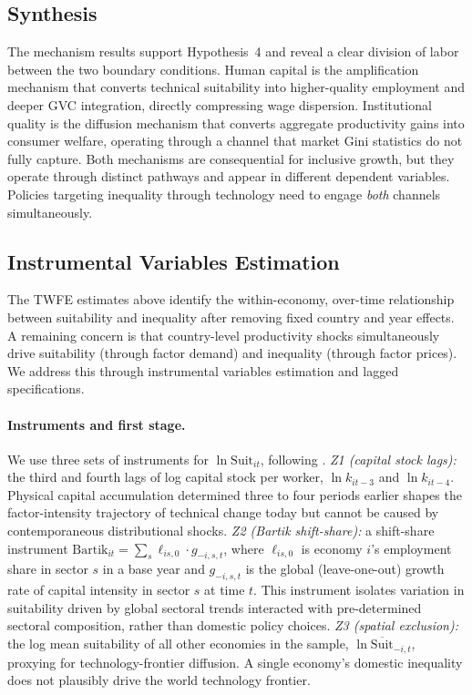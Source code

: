 \documentclass[12pt]{article}
\newcommand{\suit}{\mathrm{Suit}}
\begin{document}
\subsection{Synthesis}

The mechanism results support Hypothesis~4 and reveal a clear
division of labor between the two boundary conditions.
Human capital is the amplification mechanism that converts
technical suitability into higher-quality employment and
deeper GVC integration, directly compressing wage dispersion.
Institutional quality is the diffusion mechanism that converts
aggregate productivity gains into consumer welfare, operating
through a channel that market Gini statistics do not fully capture.
Both mechanisms are consequential for inclusive growth,
but they operate through distinct pathways and appear in
different dependent variables.
Policies targeting inequality through technology need to
engage \emph{both} channels simultaneously.

\subsection{Instrumental Variables Estimation}
\label{sec:iv}
\label{sec:robustness}

The TWFE estimates above identify the within-economy, over-time
relationship between suitability and inequality after removing fixed
country and year effects.
A remaining concern is that country-level productivity shocks
simultaneously drive suitability (through factor demand) and
inequality (through factor prices).
We address this through instrumental variables estimation and
lagged specifications.

\paragraph{Instruments and first stage.}
We use three sets of instruments for $\ln \suit_{it}$, following
\citet{li2026prosperity}.
\emph{Z1 (capital stock lags):} the third and fourth lags of log
capital stock per worker, $\ln k_{it-3}$ and $\ln k_{it-4}$.
Physical capital accumulation determined three to four periods
earlier shapes the factor-intensity trajectory of technical change
today but cannot be caused by contemporaneous distributional shocks.
\emph{Z2 (Bartik shift-share):} a shift-share instrument
$\text{Bartik}_{it} = \sum_s \ell_{is,0} \cdot g_{-i,s,t}$,
where $\ell_{is,0}$ is economy $i$'s employment share in sector $s$
in a base year and $g_{-i,s,t}$ is the global (leave-one-out)
growth rate of capital intensity in sector $s$ at time $t$.
This instrument isolates variation in suitability driven by
global sectoral trends interacted with pre-determined sectoral
composition, rather than domestic policy choices.
\emph{Z3 (spatial exclusion):} the log mean suitability of all other
economies in the sample, $\ln\overline{\suit}_{-i,t}$, proxying
for technology-frontier diffusion.
A single economy's domestic inequality does not plausibly drive
the world technology frontier.
\end{document}
